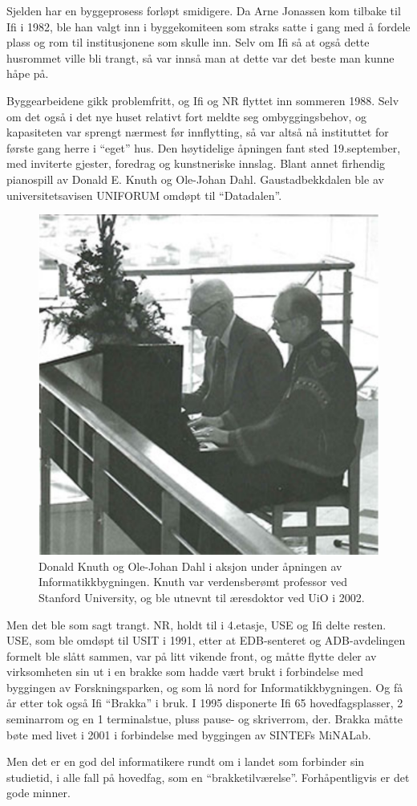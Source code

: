 \documentclass[../../main.tex]{subfiles}
\begin{document}
Sjelden har en byggeprosess forløpt smidigere. Da Arne Jonassen kom tilbake til Ifi i 1982, ble han valgt inn i byggekomiteen som straks satte i gang med å fordele plass og rom til institusjonene som skulle inn. Selv om Ifi så at også dette husrommet ville bli trangt, så var innså man at dette var det beste man kunne håpe på.

Byggearbeidene gikk problemfritt, og Ifi og NR flyttet inn sommeren 1988. Selv om det også i det nye huset relativt fort meldte seg ombyggingsbehov, og kapasiteten var sprengt nærmest før innflytting, så var altså nå instituttet for første gang herre i ``eget'' hus. Den høytidelige åpningen fant sted 19.september, med inviterte gjester, foredrag og kunstneriske innslag. Blant annet firhendig pianospill av Donald E. Knuth og Ole-Johan Dahl. Gaustadbekkdalen ble av universitetsavisen UNIFORUM omdøpt til ``Datadalen''.

\begin{figure}
	\includegraphics[width=\linewidth]{images/piano-ojd-og-donald-knuth.png}
	\caption{Donald Knuth og Ole-Johan Dahl i aksjon under åpningen av Informatikkbygningen. Knuth var verdensberømt professor ved Stanford University, og ble utnevnt til æresdoktor ved UiO i 2002.}
\end{figure}

Men det ble som sagt trangt. NR, holdt til i 4.etasje, USE og Ifi delte resten. USE, som ble omdøpt til USIT i 1991, etter at EDB-senteret og ADB-avdelingen formelt ble slått sammen, var på litt vikende front, og måtte flytte deler av virksomheten sin ut i en brakke som hadde vært brukt i forbindelse med byggingen av Forskningsparken, og som lå nord for Informatikkbygningen. Og få år etter tok også Ifi ``Brakka'' i bruk. I 1995 disponerte Ifi 65 hovedfagsplasser, 2 seminarrom og en 1 terminalstue, pluss pause- og skriverrom, der. Brakka måtte bøte med livet i 2001 i forbindelse med byggingen av SINTEFs MiNALab. 

Men det er en god del informatikere rundt om i landet som forbinder sin studietid, i alle fall på hovedfag, som en ``brakketilværelse''. Forhåpentligvis er det gode minner.
\end{document}
